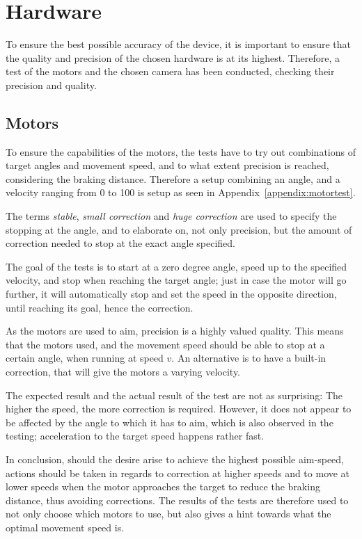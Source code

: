 \section{Hardware}\label{des:sec:hwtest}
To ensure the best possible accuracy of the device, it is important to ensure that the quality and precision of the chosen hardware is at its highest.
Therefore, a test of the motors and the chosen camera has been conducted, checking their precision and quality.

\subsection*{Motors}
To ensure the capabilities of the motors, the tests have to try out combinations of target angles and movement speed, and to what extent precision is reached, considering the braking distance.
Therefore a setup combining an angle, and a velocity ranging from 0 to 100 is setup as seen in Appendix~\ref{appendix:motortest}.

The terms \textit{stable}, \textit{small correction} and \textit{huge correction} are used to specify the stopping at the angle, and to elaborate on, not only precision, but the amount of correction needed to stop at the exact angle specified.

The goal of the tests is to start at a zero degree angle, speed up to the specified velocity, and stop when reaching the target angle; just in case the motor will go further, it will automatically stop and set the speed in the opposite direction, until reaching its goal, hence the correction.

As the motors are used to aim, precision is a highly valued quality.
This means that the motors used, and the movement speed should be able to stop at a certain angle, when running at speed $v$.
An alternative is to have a built-in correction, that will give the motors a varying velocity.

The expected result and the actual result of the test are not as surprising: The higher the speed, the more correction is required.
However, it does not appear to be affected by the angle to which it has to aim, which is also observed in the testing; acceleration to the target speed happens rather fast.

In conclusion, should the desire arise to achieve the highest possible aim-speed, actions should be taken in regards to correction at higher speeds and to move at lower speeds when the motor approaches the target to reduce the braking distance, thus avoiding corrections.
The results of the tests are therefore used to not only choose which motors to use, but also gives a hint towards what the optimal movement speed is.

